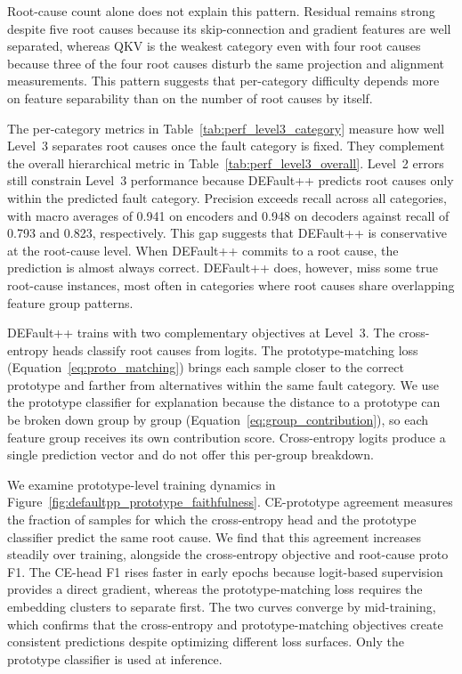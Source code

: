 Root-cause count alone does not explain this pattern. Residual remains strong despite five root causes because its skip-connection and gradient features are well separated, whereas QKV is the weakest category even with four root causes because three of the four root causes disturb the same projection and alignment measurements. This pattern suggests that per-category difficulty depends more on feature separability than on the number of root causes by itself.

The per-category metrics in Table~\ref{tab:perf_level3_category} measure how well Level~3 separates root causes once the fault category is fixed. They complement the overall hierarchical metric in Table~\ref{tab:perf_level3_overall}. Level~2 errors still constrain Level~3 performance because DEFault++ predicts root causes only within the predicted fault category. Precision exceeds recall across all categories, with macro averages of 0.941 on encoders and 0.948 on decoders against recall of 0.793 and 0.823, respectively. This gap suggests that DEFault++ is conservative at the root-cause level. When DEFault++ commits to a root cause, the prediction is almost always correct. DEFault++ does, however, miss some true root-cause instances, most often in categories where root causes share overlapping feature group patterns.

DEFault++ trains with two complementary objectives at Level~3. The cross-entropy heads classify root causes from logits. The prototype-matching loss (Equation~\ref{eq:proto_matching}) brings each sample closer to the correct prototype and farther from alternatives within the same fault category. We use the prototype classifier for explanation because the distance to a prototype can be broken down group by group (Equation~\ref{eq:group_contribution}), so each feature group receives its own contribution score. Cross-entropy logits produce a single prediction vector and do not offer this per-group breakdown.

We examine prototype-level training dynamics in Figure~\ref{fig:defaultpp_prototype_faithfulness}. CE-prototype agreement measures the fraction of samples for which the cross-entropy head and the prototype classifier predict the same root cause. We find that this agreement increases steadily over training, alongside the cross-entropy objective and root-cause proto F1. The CE-head F1 rises faster in early epochs because logit-based supervision provides a direct gradient, whereas the prototype-matching loss requires the embedding clusters to separate first. The two curves converge by mid-training, which confirms that the cross-entropy and prototype-matching objectives create consistent predictions despite optimizing different loss surfaces. Only the prototype classifier is used at inference.

